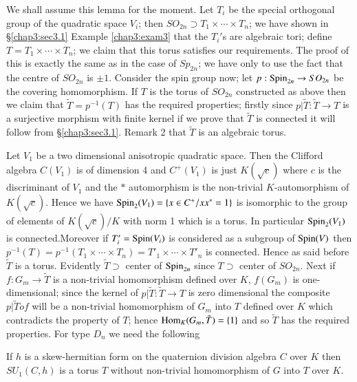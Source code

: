  We shall assume this lemma for the moment. Let $T_i$ be the special
 orthogonal group of the quadratic space $V_i$; then $SO_{2n} \supset
 T_1 \times  \cdots \times  T_n$; we have shown in \S \ref{chap3:sec3.1} Example
\ref{chap3:exam3} that the $T_i'$s are algebraic tori; define $T= T_1 \times \cdots
 \times T_n$; we claim that 
 this torus satisfies our requirements. The proof of this is exactly
 the same as in the case of $Sp_{2n}$; we have only to use the fact
 that the centre of $SO_{2n}$ is $\pm 1$. Consider the spin group now;
 let $p : \operatorname{Spin}_{2n} \to SO_{2n}$ be the covering homomorphism. If $T$
 is the torus of $SO_{2n}$ constructed as above then we claim that
 $\tilde{T} = p^{-1}(T)$ has the required properties; firstly since
 $p| \tilde{T}: \tilde{T} \to T$ is a surjective morphism with finite
 kernel if we prove that $\tilde{T}$ is connected it will follow from
 \S \ref{chap3:sec3.1}. Remark 2 that $\tilde{T}$ is
 an algebraic torus.  
 
 Let $V_1$ be a two dimensional anisotropic quadratic space. Then the
 Clifford algebra $C(V_1)$ is of dimension 4 and $C^+(V_1)$ is just
 $K ( \sqrt{c})$ where $c$ is the discriminant of $V_1$ and the $*$
 automorphism is the non-trivial $K$-automorphism of $K (
 \sqrt{c})$. Hence we have $\operatorname{Spin}_2(V_1) = \{ x \in C^+ / xx^* = 1 \}$
 is isomorphic to the group of elements of  $K ( \sqrt{c})/K$ with
 norm 1 which is a torus. In particular $\operatorname{Spin}_2(V_1)$ is
 connected.\pageoriginale Moreover if $T'_i = \operatorname{Spin} (V_i)$ is
 considered as a 
 subgroup of $\operatorname{Spin} (V)$ then $p^{-1}(T) = p^{-1} (T_1 \times \cdots
 \times  T_n)
 =T'_1 \times  \cdots \times  T'_n $ is connected. Hence as said before
 $\tilde{T}$ is a torus. Evidently $\tilde{T} \supset$ center of
 $\operatorname{Spin}_{2n}$ since $T \supset$ center of $SO_{2n}$. Next if $f : G_m \to
 \tilde{T} $ is a non-trivial homomorphism defined over $K$, $f(G_m)$
 is one-dimensional; since the kernel of $p| \tilde{T}: \tilde{T} \to
 T$ is zero dimensional the composite $p| \tilde{T} o f$ will be a
 non-trivial homomorphism of $G_m$ into $T$ defined over $K$ which
 contradicts the property of $T$; hence $\operatorname{Hom}_K (G_m,\tilde{T})= \{ 1
 \}$ and so $\tilde{T}$ has the required properties. For type $D_n$ we
 need the following  

 \begin{lem}\label{chap4:lem4}
If $h$ is a skew-hermitian form on the quaternion division algebra $C$
over $K$ then $SU_1(C,h)$ is a torus $T$ without non-trivial
homomorphism of $G$ into $T$ over $K$. 
 \end{lem}

